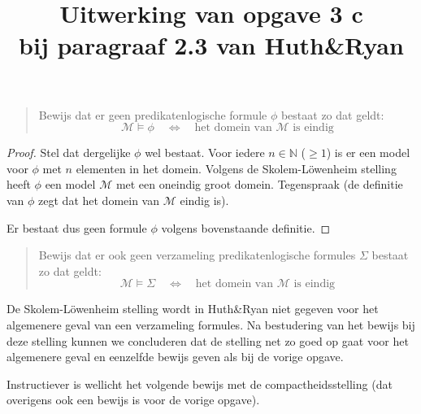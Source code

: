 \documentclass[a4paper,11pt]{article}
\title{Uitwerking van opgave 3 c\\
\normalsize{bij paragraaf 2.3 van Huth\&Ryan}}
\date{}
\begin{document}
\maketitle


\begin{quote}
  Bewijs dat er geen predikatenlogische formule $\phi$ bestaat zo dat geldt:
  \begin{equation*}
    \mathcal{M} \models \phi
    \quad \Leftrightarrow \quad
    \text{het domein van $\mathcal{M}$ is eindig}
  \end{equation*}
\end{quote}

\begin{proof}
Stel dat dergelijke $\phi$ wel bestaat. Voor iedere $n \in \mathbb{N}$
($\geq 1$) is er een model voor $\phi$ met $n$ elementen in het domein. Volgens
de Skolem-L\"owenheim stelling heeft $\phi$ een model $\mathcal{M}$ met een
oneindig groot domein. Tegenspraak (de definitie van $\phi$ zegt dat het domein
van $\mathcal{M}$ eindig is).

Er bestaat dus geen formule $\phi$ volgens bovenstaande definitie.
\end{proof}


\begin{quote}
  Bewijs dat er ook geen verzameling predikatenlogische formules $\Sigma$
  bestaat zo dat geldt:
  \begin{equation*}
    \mathcal{M} \models \Sigma
    \quad \Leftrightarrow \quad
    \text{het domein van $\mathcal{M}$ is eindig}
  \end{equation*}
\end{quote}

De Skolem-L\"owenheim stelling wordt in Huth\&Ryan niet gegeven voor het
algemenere geval van een verzameling formules. Na bestudering van het bewijs bij
deze stelling kunnen we concluderen dat de stelling net zo goed op gaat voor het
algemenere geval en eenzelfde bewijs geven als bij de vorige opgave.

Instructiever is wellicht het volgende bewijs met de compactheidsstelling (dat
overigens ook een bewijs is voor de vorige opgave).
\end{document}
